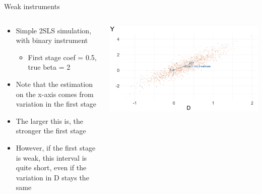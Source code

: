 \documentclass[notes,11pt, aspectratio=169]{beamer}
\begin{document}
\begin{frame}{Weak instruments}
  \begin{columns}[T] %
    \begin{column}{0.5\textwidth}
  \begin{itemize}
  \item Simple 2SLS simulation, with binary instrument
    \begin{itemize}
    \item First stage coef = 0.5, true beta = 2
    \end{itemize}
  \item Note that the estimation on the x-axis comes from variation in the first stage
  \item The larger this is, the stronger the first stage
  \item However, if the first stage is weak, this interval is quite short, even if the variation in D stays the same
  \end{itemize}
\end{column}
\begin{column}{0.5\textwidth}
  \includegraphics[width=\linewidth]{images/weakiv_example1.png}
\end{column}
\end{columns}
\end{frame}
\end{document}
